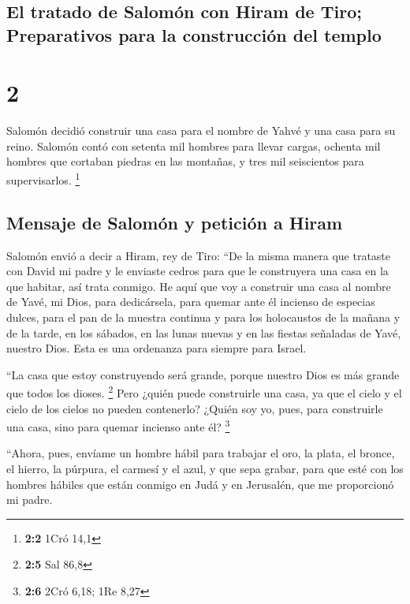 \hypertarget{el-tratado-de-salomuxf3n-con-hiram-de-tiro-preparativos-para-la-construcciuxf3n-del-templo}{%
\subsection{El tratado de Salomón con Hiram de Tiro; Preparativos para
la construcción del
templo}\label{el-tratado-de-salomuxf3n-con-hiram-de-tiro-preparativos-para-la-construcciuxf3n-del-templo}}

\hypertarget{section-1}{%
\section{2}\label{section-1}}

 Salomón decidió construir una casa para el nombre de
Yahvé y una casa para su reino.  Salomón contó con setenta
mil hombres para llevar cargas, ochenta mil hombres que cortaban piedras
en las montañas, y tres mil seiscientos para supervisarlos. \footnote{\textbf{2:2}
  1Cró 14,1}

\hypertarget{mensaje-de-salomuxf3n-y-peticiuxf3n-a-hiram}{%
\subsection{Mensaje de Salomón y petición a
Hiram}\label{mensaje-de-salomuxf3n-y-peticiuxf3n-a-hiram}}

 Salomón envió a decir a Hiram, rey de Tiro: ``De la misma
manera que trataste con David mi padre y le enviaste cedros para que le
construyera una casa en la que habitar, así trata conmigo.
 He aquí que voy a construir una casa al nombre de Yavé,
mi Dios, para dedicársela, para quemar ante él incienso de especias
dulces, para el pan de la muestra continua y para los holocaustos de la
mañana y de la tarde, en los sábados, en las lunas nuevas y en las
fiestas señaladas de Yavé, nuestro Dios. Esta es una ordenanza para
siempre para Israel.

 ``La casa que estoy construyendo será grande, porque
nuestro Dios es más grande que todos los dioses. \footnote{\textbf{2:5}
  Sal 86,8}  Pero ¿quién puede construirle una casa, ya
que el cielo y el cielo de los cielos no pueden contenerlo? ¿Quién soy
yo, pues, para construirle una casa, sino para quemar incienso ante él?
\footnote{\textbf{2:6} 2Cró 6,18; 1Re 8,27}

 ``Ahora, pues, envíame un hombre hábil para trabajar el
oro, la plata, el bronce, el hierro, la púrpura, el carmesí y el azul, y
que sepa grabar, para que esté con los hombres hábiles que están conmigo
en Judá y en Jerusalén, que me proporcionó mi padre.


